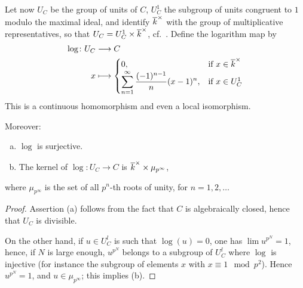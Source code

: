 \begin{subappendices}
Let now $U_C$ be the group of units of $C$, $U_C^1$ the subgroup of units
congruent to $1$ modulo the maximal ideal, and identify ${\overline{k}}^\times$
with the group of multiplicative representatives, so that $U_C = U_C^1 \times
{\overline{k}}^\times$, cf.\ \cite[44]{29}. Define the logarithm map by
\begin{align*}
	\log \colon U_C &\longrightarrow C \\
	x &\longmapsto
	\begin{cases}
		0, & \text{if } x \in {\overline{k}}^\times \\
		\displaystyle \sum_{n=1}^{\infty} \frac{(-1)^{n-1}}{n} (x-1)^n, & \text{if } x \in U_C^1
	\end{cases}
\end{align*}
This is a continuous homomorphism and even a local isomorphism.

\dpage

Moreover:

\begin{lem}
\begin{enumerate}[(a)]
	\item $\log$ is surjective.
	\item The kernel of $\log \colon U_C \to C$ is $\overline{k}^\times \times
\mu_{p^\infty}$,
\end{enumerate}
where $\mu_{p^\infty}$ is the set of all $p^n$-th roots of unity, for $n =
1,2, \hdots$
\end{lem}

\begin{proof}
Assertion (a) follows from the fact that $C$ is algebraically closed, hence that
$U_C$ is divisible.

On the other hand, if $u \in U^l_C$ is such that $\log(u) = 0$, one has $\lim
u^{p^N} = 1$, hence, if $N$ is large enough, $u^{p^N}$ belongs to a subgroup of
$U^l_C$ where $\log$ is injective (for instance the subgroup of elements $x$
with $x \equiv 1 \mod p^2$). Hence $u^{p^N} = 1$, and $u \in \mu_{p^\infty}$;
this implies (b).
\end{proof}


\end{subappendices}
